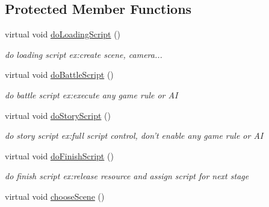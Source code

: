 \subsection*{Protected Member Functions}
\begin{DoxyCompactItemize}
\item 
\hypertarget{class_stage_extra_a6be9e2343bb67a61d273576e9bd85027}{
virtual void \hyperlink{class_stage_extra_a6be9e2343bb67a61d273576e9bd85027}{doLoadingScript} ()}
\label{class_stage_extra_a6be9e2343bb67a61d273576e9bd85027}

\begin{DoxyCompactList}\small\item\em do loading script ex:create scene, camera... \end{DoxyCompactList}\item 
\hypertarget{class_stage_extra_adaadc3a934a5e362134b44cb1e224356}{
virtual void \hyperlink{class_stage_extra_adaadc3a934a5e362134b44cb1e224356}{doBattleScript} ()}
\label{class_stage_extra_adaadc3a934a5e362134b44cb1e224356}

\begin{DoxyCompactList}\small\item\em do battle script ex:execute any game rule or AI \end{DoxyCompactList}\item 
\hypertarget{class_stage_extra_a65cc99ecaebcb2d44e8df2ca67b821d5}{
virtual void \hyperlink{class_stage_extra_a65cc99ecaebcb2d44e8df2ca67b821d5}{doStoryScript} ()}
\label{class_stage_extra_a65cc99ecaebcb2d44e8df2ca67b821d5}

\begin{DoxyCompactList}\small\item\em do story script ex:full script control, don't enable any game rule or AI \end{DoxyCompactList}\item 
\hypertarget{class_stage_extra_ad4dde10e891f1c750736da5b95fe9870}{
virtual void \hyperlink{class_stage_extra_ad4dde10e891f1c750736da5b95fe9870}{doFinishScript} ()}
\label{class_stage_extra_ad4dde10e891f1c750736da5b95fe9870}

\begin{DoxyCompactList}\small\item\em do finish script ex:release resource and assign script for next stage \end{DoxyCompactList}\item 
\hypertarget{class_stage_extra_accd95257c503eb317dc89733f9b8529a}{
virtual void \hyperlink{class_stage_extra_accd95257c503eb317dc89733f9b8529a}{chooseScene} ()}
\label{class_stage_extra_accd95257c503eb317dc89733f9b8529a}


\end{DoxyCompactItemize}
